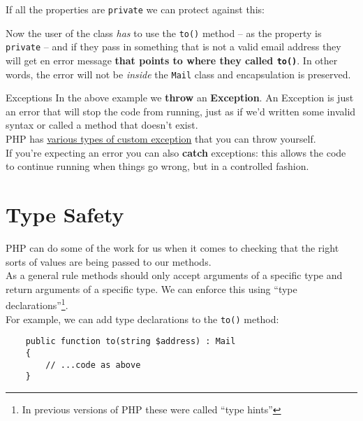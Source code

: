 If all the properties are \texttt{private} we can protect against this:


Now the user of the class \textit{has} to use the \texttt{to()} method – as the property is \texttt{private} – and if they pass in something that is not a valid email address they will get en error message \textbf{that points to where they called \texttt{to()}}. In other words, the error will not be \textit{inside} the \texttt{Mail} class and encapsulation is preserved.

\pagebreak

\begin{infobox}{Exceptions}
    In the above example we \textbf{throw} an \textbf{Exception}. An Exception is just an error that will stop the code from running, just as if we'd written some invalid syntax or called a method that doesn't exist.
    \\

    PHP has \href{https://www.php.net/manual/en/spl.exceptions.php}{various types of custom exception} that you can throw yourself.
    \\

    If you're expecting an error you can also \textbf{catch} exceptions: this allows the code to continue running when things go wrong, but in a controlled fashion.
\end{infobox}


\section{Type Safety}

PHP can do some of the work for us when it comes to checking that the right sorts of values are being passed to our methods.
\\

As a general rule methods should only accept arguments of a specific type and return arguments of a specific type. We can enforce this using ``type declarations''\footnote{In previous versions of PHP these were called ``type hints''}.
\\

For example, we can add type declarations to the \texttt{to()} method:

\begin{verbatim}
    public function to(string $address) : Mail
    {
        // ...code as above
    }
\end{verbatim}

